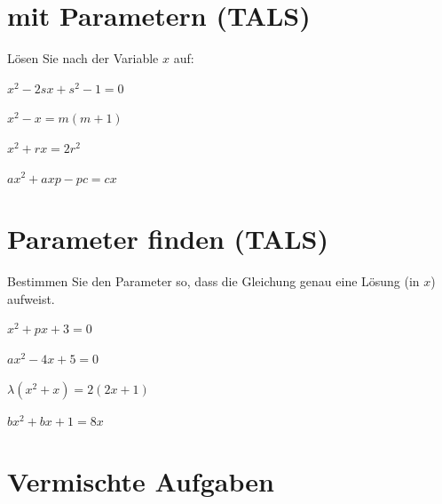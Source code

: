 \section{mit Parametern (TALS)}
Lösen Sie nach der Variable $x$ auf:

\begin{bbwAufgabenBlock}
\item $ x^2 - 2sx + s^2 -1 = 0$

\item $ x^2 - x= m(m+1)$

\item $ x^2 + rx = 2r^2 $

\item $ ax^2 + axp - pc = cx$


\end{bbwAufgabenBlock}
\newpage
\section{Parameter finden (TALS)}
Bestimmen Sie den Parameter so, dass die Gleichung genau eine Lösung
(in $x$) aufweist.

\begin{bbwAufgabenBlock}
\item $ x^2 + px + 3= 0$

\item $ ax^2 - 4x + 5= 0$

\item $ \lambda (x^2+x)=2(2x+1) $

\item $bx^2 + bx + 1 =8x $

\end{bbwAufgabenBlock}
\newpage
\section{Vermischte Aufgaben}

